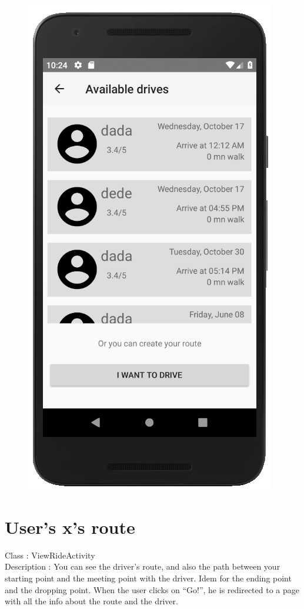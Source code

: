 \begin{figure}[h!]
\begin{center}
\includegraphics[scale = 0.6]{diagrams/Available_drives.png} 
\end{center}
\end{figure}

\section{User's x's route}
Class : ViewRideActivity \\
Description : You can see the driver’s route, and also the path between your starting point and the meeting point with the driver. Idem for the ending point and the dropping point. When the user clicks on “Go!”, he is redirected to a page with all the info about the route and the driver.

